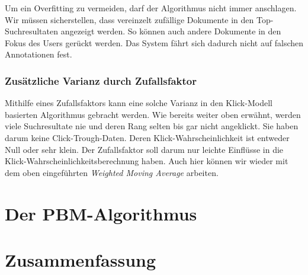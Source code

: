 Um ein Overfitting zu vermeiden, darf der Algorithmus nicht immer anschlagen. Wir müssen sicherstellen, dass vereinzelt zufällige Dokumente in den \glqq Top-Suchresultaten\grqq{} angezeigt werden. So können auch andere Dokumente in den Fokus des Users gerückt werden. Das System fährt sich dadurch nicht auf falschen Annotationen fest. 

\subsubsection{Zusätzliche Varianz durch Zufallsfaktor}
\label{sec:Reranking:Methodik:Vergessen:Zufallsfaktor}

Mithilfe eines Zufallsfaktors kann eine solche Varianz in den Klick-Modell basierten Algorithmus gebracht werden. Wie bereits weiter oben erwähnt, werden viele Suchresultate nie und deren Rang selten bis gar nicht angeklickt. Sie haben darum keine Click-Trough-Daten. Deren Klick-Wahrscheinlichkeit ist entweder Null oder sehr klein. Der Zufallsfaktor soll darum nur leichte Einflüsse in die Klick-Wahrscheinlichkeitsberechnung haben. Auch hier können wir wieder mit dem oben eingeführten \textit{Weighted Moving Average} arbeiten.


\section{Der PBM-Algorithmus}
\label{sec:Reranking:PBM-Algorithmus}



\section{Zusammenfassung}
\label{sec:Reranking:Zusammenfassung}

